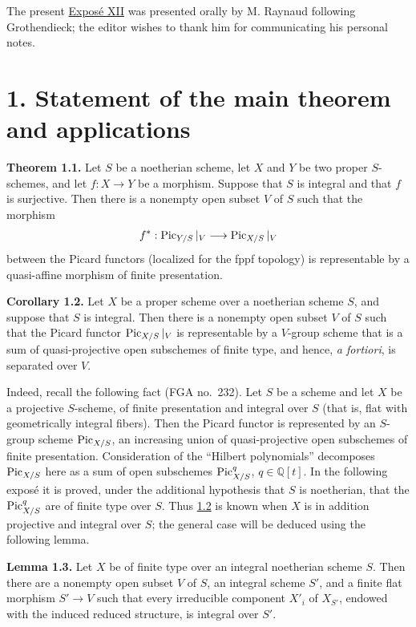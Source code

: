The present \hyperlink{sga6.e12.expose}{Expos\'e XII} was presented orally by M. Raynaud following
Grothendieck; the editor wishes to thank him for communicating his personal
notes.

\section*{1. Statement of the main theorem and applications}

\textbf{Theorem 1.1.} Let $S$ be a noetherian scheme, let $X$ and $Y$ be two
proper $S$-schemes, and let $f:X\to Y$ be a morphism. Suppose that $S$ is
integral and that $f$ is surjective. Then there is a nonempty open subset $V$
of $S$ such that the morphism
\[
  f^*:\operatorname{Pic}_{Y/S}|_V\longrightarrow\operatorname{Pic}_{X/S}|_V
\]
between the Picard functors (localized for the fppf topology) is representable
by a quasi-affine morphism of finite presentation.

\textbf{Corollary 1.2.} Let $X$ be a proper scheme over a noetherian scheme
$S$, and suppose that $S$ is integral. Then there is a nonempty open subset
$V$ of $S$ such that the Picard functor $\operatorname{Pic}_{X/S}|_V$ is representable by a
$V$-group scheme that is a sum of quasi-projective open subschemes of finite
type, and hence, \emph{a fortiori}, is separated over $V$.

Indeed, recall the following fact (FGA no.~232). Let $S$ be a scheme and let
$X$ be a projective $S$-scheme, of finite presentation and integral over $S$
(that is, flat with geometrically integral fibers). Then the Picard functor is
represented by an $S$-group scheme $\operatorname{Pic}_{X/S}$, an increasing union of
quasi-projective open subschemes of finite presentation. Consideration of the
``Hilbert polynomials'' decomposes $\operatorname{Pic}_{X/S}$ here as a sum of open
subschemes $\operatorname{Pic}^q_{X/S}$, $q\in\mathbb Q[t]$. In the following expos\'e it is
proved, under the additional hypothesis that $S$ is noetherian, that the
$\operatorname{Pic}^q_{X/S}$ are of finite type over $S$. Thus \hyperlink{sga6.e12.cor.1-2}{1.2} is known when $X$ is in
addition projective and integral over $S$; the general case will be deduced
using the following lemma.

\textbf{Lemma 1.3.} Let $X$ be of finite type over an integral noetherian
scheme $S$. Then there are a nonempty open subset $V$ of $S$, an integral
scheme $S'$, and a finite
flat morphism $S'\to V$ such that every irreducible component $X'_i$ of
$X_{S'}$, endowed with the induced reduced structure, is integral over $S'$.

